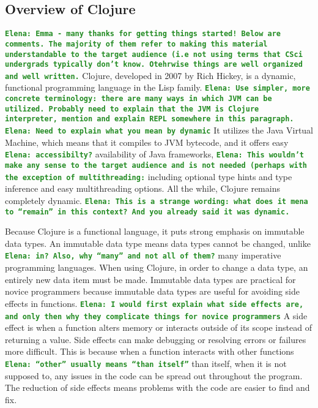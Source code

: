 \documentclass[12pt]{article}
\newcommand{\comment}[1]{{\bf \tt  {#1}}}
\newcommand{\emcomment}[1]{\textcolor{ForestGreen}{\comment{Elena: {#1}}}}
\begin{document}
\subsection{Overview of Clojure}\label{sec:clojure}
\emcomment{Emma - many thanks for getting things started! Below are
  comments. The majority of them refer to making this material
  understandable to the target audience (i.e not using terms that
  CSci undergrads typically don't know. Otehrwise things are well
  organized and well written.}
Clojure, developed in 2007 by Rich Hickey, is a dynamic, functional
programming language in the Lisp family. 
\emcomment{Use simpler, more concrete terminology: there are many ways
  in which JVM can be utilized. Probably need to explain that the JVM
  is Clojure interpreter, mention and explain REPL somewhere in this paragraph.}
\emcomment{Need to explain what you mean by dynamic}
It utilizes the Java Virtual
Machine, which means that it compiles to JVM bytecode, and it offers
easy 
\emcomment{accessibilty?} 
availability of Java frameworks, 
\emcomment{This wouldn't make any sense to the target audience and is
  not needed (perhaps with the exception of multithreading:}
including optional type hints
and type inference and easy multithreading options. All the while,
Clojure remains completely dynamic.  
\emcomment{This is a strange wording: what does it mena to ``remain''
  in this context? And you already said it was dynamic.}

Because Clojure is a functional language, it puts strong emphasis on
immutable data types. An immutable data type means data types cannot
be changed, unlike \emcomment{in? Also, why ``many'' and not all of
  them?} many imperative programming languages. When using
Clojure, in order to change a data type, an entirely new data item
must be made. Immutable data types are practical for novice
programmers because immutable data types are useful for avoiding side
effects in functions. \emcomment{I would first explain what side
  effects are, and only then why they complicate things for novice
  programmers}
A side effect is when a function alters memory
or interacts outside of its scope instead of returning a value. Side
effects can make debugging or resolving errors or failures more
difficult. This is because when a function interacts with other
functions \emcomment{``other'' usually means ``than itself''} than
itself, when it is not supposed to, any issues in the 
code can be spread out throughout the program. The reduction of side
effects means problems with the code are easier to find and fix. 
\end{document}
